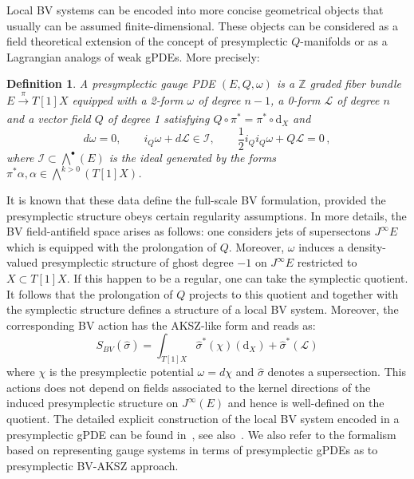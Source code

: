 \documentclass[a4paper,12pt]{article}
\numberwithin{equation}{section} %
\newtheorem{definition}[thm]{Definition}
\renewcommand{\hat}{\widehat}
\newcommand{\dx}{\mathrm{d}_X}
\def\cI{\mathcal{I}}
\def\cL{\mathcal{L}}
\begin{document}
Local BV systems can be encoded into more concise geometrical objects that usually can be assumed finite-dimensional. These objects can be considered as a field theoretical extension of the concept of presymplectic $Q$-manifolds or as a Lagrangian analogs of weak gPDEs. More precisely:
\begin{definition} \label{Def:w_presymp_gPDE}
A presymplectic gauge PDE $(E,Q,\omega)$ is a $\mathbb{Z}$ graded fiber bundle $E \xrightarrow[]{\pi} T[1]X$ equipped with a 2-form $\omega$ of 
degree $n-1$, a 0-form $\cL$ of degree $n$ 
and a vector field $Q$ of degree 1 satisfying $Q\circ \pi^* = \pi^* \circ \dx$ and 
\begin{equation}
\label{wgPDE}
    d\omega = 0, \qquad i_Q\omega + d\mathcal{L} \in \mathcal{I}, \qquad \frac{1}{2} i_Q i_Q\omega + Q\mathcal{L} = 0\,,
\end{equation}
where $\cI \subset \bigwedge^\bullet(E)$ is the ideal generated by the forms $\pi^*\alpha, \alpha \in \bigwedge^{k > 0}(T[1]X)$.
\end{definition}
It is known that these data define the full-scale BV formulation, provided the presymplectic structure obeys certain regularity assumptions. In more details, the BV field-antifield space arises as follows: one considers jets of supersectons $J^\infty{E}$ which is equipped with the prolongation of $Q$. Moreover,
$\omega$ induces a density-valued presymplectic structure of ghost degree $-1$ on $J^\infty{E}$ restricted to $X\subset T[1]X$. If this happen to be a regular, one can take the symplectic quotient. It follows that the prolongation of $Q$ projects to this quotient and together with the symplectic structure defines a structure of a local BV system. Moreover, the corresponding BV action has the AKSZ-like form and reads as:
\begin{equation}
\label{BV-AKSZ}
S_{BV}(\hat\sigma)=\int_{T[1]X}\hat\sigma^*(\chi)(\dx)+\hat\sigma^*(\cL)
\end{equation}
where $\chi$ is the presymplectic potential $\omega=d\chi$ and $\hat\sigma$ denotes a supersection. This actions does not depend on fields associated to the kernel directions of the induced presymplectic structure on $J^\infty(E)$ and hence is well-defined on the quotient. The detailed explicit construction of the local BV system encoded in a presymplectic gPDE can be found in~\cite{Dneprov:2024cvt}, see also~\cite{Grigoriev:2020xec,Dneprov:2022jyn,Grigoriev:2022zlq}.  We also refer to the formalism based on representing gauge systems in terms of presymplectic gPDEs as to presymplectic BV-AKSZ approach.
\end{document}
